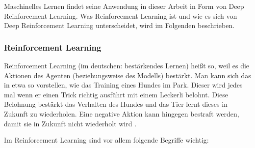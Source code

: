 Maschinelles Lernen findet seine Anwendung in dieser Arbeit in Form von Deep Reinforcement Learning. Was Reinforcement Learning ist und wie es sich von Deep Reinforcement Learning unterscheidet, wird im Folgenden beschrieben.
\subsubsection{Reinforcement Learning}
Reinforcement Learning (im deutschen: bestärkendes Lernen) heißt so, weil es die Aktionen des Agenten (beziehungsweise des Modells) bestärkt. Man kann sich das in etwa so vorstellen, wie das Training eines Hundes im Park. Dieser wird jedes mal wenn er einen Trick richtig ausführt mit einem Leckerli belohnt. Diese Belohnung bestärkt das Verhalten des Hundes und das Tier lernt dieses in Zukunft zu wiederholen. Eine negative Aktion kann hingegen bestraft werden, damit sie in Zukunft nicht wiederholt wird \cite[Seite 11]{ris-ala_fundamentals_2023}.

Im Reinforcement Learning sind vor allem folgende Begriffe wichtig:

